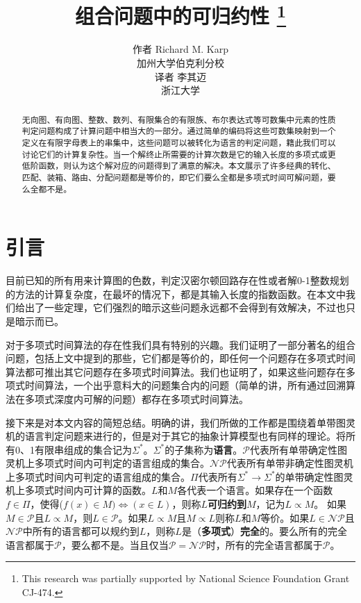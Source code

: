 \documentclass[twocolumn]{article}
\title{
    组合问题中的可归约性
    \thanks{This research was partially supported by National Science Foundation Grant CJ-474.}
}
\author{
    作者
    Richard M. Karp\\
    加州大学伯克利分校
    \\
    译者 李其迈
    \\
    浙江大学
}
\date{}
\theoremstyle{nonumberplain}%
\begin{document}
\maketitle

\renewcommand\abstractname{摘要}
\begin{abstract}
无向图、有向图、整数、数列、有限集合的有限族、布尔表达式等可数集中元素的性质判定问题构成了计算问题中相当大的一部分。通过简单的编码将这些可数集映射到一个定义在有限字母表上的串集中，这些问题可以被转化为语言的判定问题，籍此我们可以讨论它们的计算复杂性。当一个解终止所需要的计算次数是它的输入长度的多项式或更低阶函数，则认为这个解对应的问题得到了满意的解决。本文展示了许多经典的转化、匹配、装箱、路由、分配问题都是等价的，即它们要么全都是多项式时间可解问题，要么全都不是。
\end{abstract}

\section{引言}

    目前已知的所有用来计算图的色数，判定汉密尔顿回路存在性或者解0-1整数规划的方法的计算复杂度，在最坏的情况下，都是其输入长度的指数函数。在本文中我们给出了一些定理，它们强烈的暗示这些问题永远都不会得到有效解决，不过也只是暗示而已。

    对于多项式时间算法的存在性我们具有特别的兴趣。我们证明了一部分著名的组合问题，包括上文中提到的那些，它们都是等价的，即任何一个问题存在多项式时间算法都可推出其它问题存在多项式时间算法。我们也证明了，如果这些问题存在多项式时间算法，一个出乎意料大的问题集合内的问题（简单的讲，所有通过回溯算法在多项式深度内可解的问题）都存在多项式时间算法。

    接下来是对本文内容的简短总结。明确的讲，我们所做的工作都是围绕着单带图灵机的语言判定问题来进行的，但是对于其它的抽象计算模型也有同样的理论。将所有0、1有限串组成的集合记为$\Sigma^*$。$\Sigma^*$的子集称为{\bf 语言}。$\mathcal{P}$代表所有单带确定性图灵机上多项式时间内可判定的语言组成的集合。$\mathcal{NP}$代表所有单带非确定性图灵机上多项式时间内可判定的语言组成的集合。$\Pi$代表所有$\Sigma^*\to\Sigma^*$的单带确定性图灵机上多项式时间内可计算的函数。$L$和$M$各代表一个语言。如果存在一个函数$f\in\Pi$，使得($f(x)\in M)\Leftrightarrow(x\in L)$，则称$L${\bf 可归约到}$M$，记为$L\propto M$。
    如果$M\in\mathcal{P}$且$L\propto M$，则$L\in\mathcal{P}$。如果$L\propto M$且$M\propto L$则称$L$和$M$等价。如果$L\in\mathcal{NP}$且$\mathcal{NP}$中所有的语言都可以规约到$L$，则称$L$是（{\bf 多项式}）{\bf 完全}的。要么所有的完全语言都属于$\mathcal{P}$，要么都不是。当且仅当$\mathcal{P} = \mathcal{NP}$时，所有的完全语言都属于$\mathcal{P}$。
\end{document}

